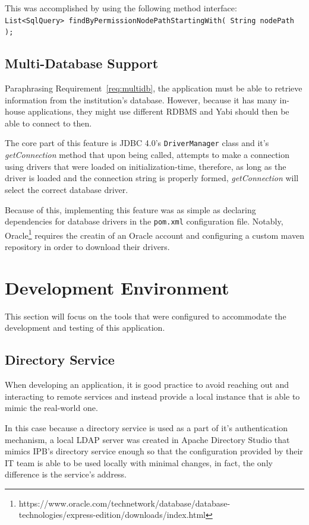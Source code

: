 This was accomplished by using the following method interface:\\
\texttt{List<SqlQuery> findByPermissionNodePathStartingWith( String~nodePath );}

\subsection{Multi-Database Support}
Paraphrasing Requirement~\ref{req:multidb}, the application must be able to retrieve information from the institution's database. However, because it has many in-house applications, they might use different \gls{RDBMS} and \gls{Yabi} should then be able to connect to then.

The core part of this feature is \gls{JDBC} 4.0's \texttt{DriverManager} class and it's \textit{getConnection} method that upon being called, attempts to make a connection using drivers that were loaded on initialization-time, therefore, as long as the driver is loaded and the connection string is properly formed, \textit{getConnection} will select the correct database driver.

Because of this, implementing this feature was as simple as declaring dependencies for database drivers in the \texttt{pom.xml} configuration file. Notably, Oracle\footnote{https://www.oracle.com/technetwork/database/database-technologies/express-edition/downloads/index.html} requires the creatin of an Oracle account and configuring a custom maven repository in order to download their drivers.

\section{Development Environment}\label{cha:implementation:sec:development}
This section will focus on the tools that were configured to accommodate the development and testing of this application.

\subsection{Directory Service}
When developing an application, it is good practice to avoid reaching out and interacting to remote services and instead provide a local instance that is able to mimic the real-world one.

In this case because a directory service is used as a part of it's authentication mechanism, a local \gls{LDAP} server was created in Apache Directory Studio that mimics \gls{IPB}'s directory service enough so that the configuration provided by their \gls{IT} team is able to be used locally with minimal changes, in fact, the only difference is the service's address.


